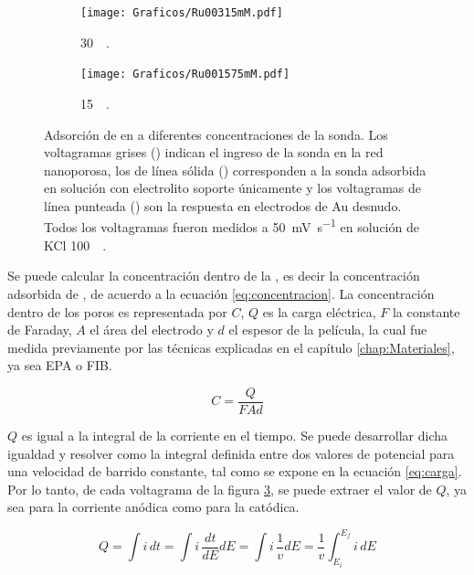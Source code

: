 \begin{figure}[th]
\begin{subfigure}[t]{0.325\textwidth}
			        	\texttt{[image: Graficos/Ru00315mM.pdf]}
			       		\vspace*{-0.40cm}\caption{\aminorutenio\space \SI{30}{\micro\Molar}.}
			         	\label{fig:Ru00315mM}
			     		\end{subfigure}
		     		\begin{subfigure}[t]{0.325\textwidth}
			        	\texttt{[image: Graficos/Ru001575mM.pdf]}
			       		\vspace*{-0.40cm}\caption{\aminorutenio\space \SI{15}{\micro\Molar}.}
			         	\label{fig:Ru001575mM}
			     		\end{subfigure}	
		 	   	   	\caption[Preconcentración de \aminorutenio\space en \pdmF]{Adsorción de \ru\space en \pdm\space a diferentes concentraciones de la sonda. Los voltagramas grises (\usebox{\gris}) indican el ingreso de la sonda en la red nanoporosa, los de línea sólida (\usebox{\negro}) corresponden a la sonda adsorbida en solución con electrolito soporte únicamente y los voltagramas de línea punteada (\usebox{\punteado}) son la respuesta en electrodos de Au desnudo. Todos los voltagramas fueron medidos a \SI{50}{\milli\volt\per\second} en solución de KCl \SI{100}{\milli\Molar}.}
		     		\label{fig:preconcentraciones}
		     	   	\end{figure} 	

		Se puede calcular la concentración dentro de la \pdm, es decir la concentración adsorbida de \ru, de acuerdo a la ecuación \ref{eq:concentracion}. La concentración dentro de los poros es representada por $C$, $Q$ es la carga eléctrica, $F$ la constante de Faraday, $A$ el área del electrodo y $d$ el espesor de la película, la cual fue medida previamente por las técnicas explicadas en el capítulo \ref{chap:Materiales}, ya sea EPA o FIB.

			\begin{equation}
					C=\frac{Q}{FAd}
					\label{eq:concentracion}
			\end{equation}

		$Q$ es igual a la integral de la corriente en el tiempo. Se puede desarrollar dicha igualdad y resolver como la integral definida entre dos valores de potencial para una velocidad de barrido constante, tal como se expone en la ecuación \ref{eq:carga}. Por lo tanto, de cada voltagrama de la figura \ref{fig:preconcentraciones}, se puede extraer el valor de $Q$, ya sea para la corriente anódica como para la catódica.
		
			\begin{equation}
					Q=\int i\,dt = \int i\, \frac{dt}{dE} dE = \int i\,\frac{1}{v}dE=\frac{1}{v}\int_{E_{i}}^{E_{f}} i\,dE
					\label{eq:carga}
			\end{equation}

